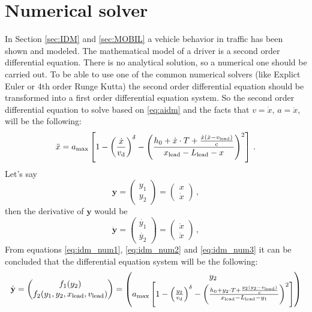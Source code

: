 		\section{Numerical solver}
			In Section \ref{sec:IDM} and \ref{sec:MOBIL} a vehicle behavior in traffic has been shown and modeled. The mathematical model of a driver is a second order differential equation. There is no analytical solution, so a numerical one should be carried out. To be able to use one of the common numerical solvers (like Explict Euler or 4th order Runge Kutta) the second order differential equation should be transformed into a first order differential equation system. So the second order differential equation to solve based on \ref{eq:aidm} and the facts that $v=\dot{x},\,a=\ddot{x}$, will be the following:
			\begin{equation}
				\ddot{x}=a_{\rm max}\left [ 1 - \left ( \frac{\dot{x}}{{v_{\rm d}}} \right )^\delta - \left ( \frac{h_0 + \dot{x}\cdot T + \frac{\dot{x}(\dot{x}-v_{\rm lead})}{{\rm c}}}{x_{\rm lead}-L_{\rm lead} - x} \right )^2 \right ]\,.
				\label{eq:idm_num1}
			\end{equation}
			Let's say
			\begin{equation}
				\textbf{y}=
				\begin{pmatrix}
					y_1\\
					y_2
				\end{pmatrix}
				=
				\begin{pmatrix}
					x\\
					\dot{x}
				\end{pmatrix}\,,
				\label{eq:idm_num2}
			\end{equation}
			then the derivative of $\textbf{y}$ would be
			\begin{equation}
				\dot{\textbf{y}}=
				\begin{pmatrix}
					\dot{y_1}\\
					\dot{y_2}
				\end{pmatrix}
				=
				\begin{pmatrix}
					\dot{x}\\
					\ddot{x}
				\end{pmatrix}\,,
				\label{eq:idm_num3}
			\end{equation}
			From equations \ref{eq:idm_num1}, \ref{eq:idm_num2} and \ref{eq:idm_num3} it can be concluded that the differential equation system will be the following:
			\begin{equation}
				\dot{\textbf{y}}
				=
				\begin{pmatrix}
					f_1(y_2)\\
					f_2(y_1,y_2,x_{\rm lead},v_{\rm lead})\\
				\end{pmatrix}
				=
				\begin{pmatrix}
					y_2\\
					a_{\rm max}\left [ 1 - \left ( \frac{y_2}{{v_{\rm d}}} \right )^{\delta} - \left ( \frac{h_0 + y_2\cdot T + \frac{y_2(y_2-v_{\rm lead})}{{\rm c}}}{x_{\rm lead} - L_{\rm lead} - y_1} \right )^2 \right ]
				\end{pmatrix}
				\label{eq:numerical_idm}
			\end{equation}